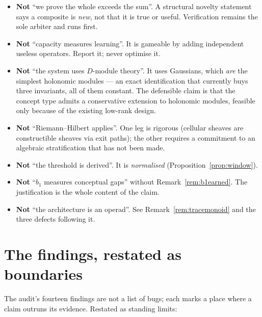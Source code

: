 \begin{itemize}
  \item \textbf{Not} ``we prove the whole exceeds the sum''. A
        structural novelty statement says a composite is \emph{new}, not
        that it is true or useful. Verification remains the sole
        arbiter and runs first.
  \item \textbf{Not} ``capacity measures learning''. It is gameable by
        adding independent useless operators. Report it; never optimise
        it.
  \item \textbf{Not} ``the system uses $D$-module theory''. It uses
        Gaussians, which \emph{are} the simplest holonomic modules --- an
        exact identification that currently buys three invariants, all
        of them constant. The defensible claim is that the concept type
        admits a conservative extension to holonomic modules, feasible
        only because of the existing low-rank design.
  \item \textbf{Not} ``Riemann--Hilbert applies''. One leg is rigorous
        (cellular sheaves are constructible sheaves via exit paths); the
        other requires a commitment to an algebraic stratification that
        has not been made.
  \item \textbf{Not} ``the threshold is derived''. It is
        \emph{normalised} (Proposition~\ref{prop:window}).
  \item \textbf{Not} ``$b_1$ measures conceptual gaps'' without
        Remark~\ref{rem:b1earned}. The justification is the whole
        content of the claim.
  \item \textbf{Not} ``the architecture is an operad''. See
        Remark~\ref{rem:tracemonoid} and the three defects following it.
\end{itemize}

\section{The findings, restated as boundaries}

The audit's fourteen findings are not a list of bugs; each marks a place
where a claim outruns its evidence. Restated as standing limits:

